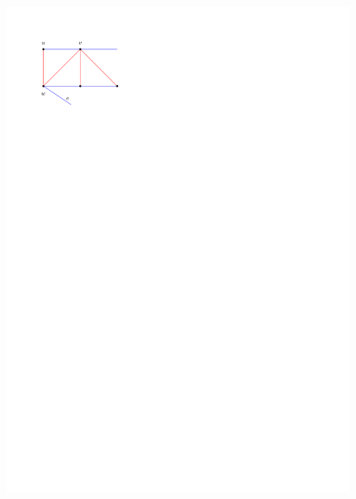    \begin{figure}[h]
      \centering
      \includegraphics[scale=1]{unifiedAlgo/img/sweep/splitsAboveEachOther.pdf}
      \caption{}
      \label{fig:sweep:splitsAboveEachOther}
    \end{figure}
